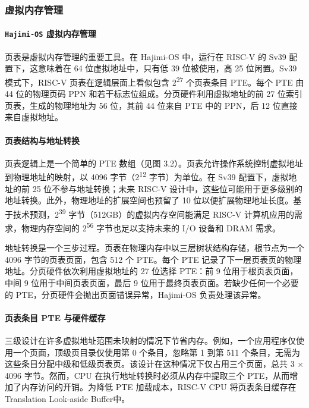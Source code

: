 \documentclass[UTF8]{article}
\begin{document}
\subsubsection{虚拟内存管理}

\paragraph{\texttt{Hajimi-OS} 虚拟内存管理\\}
页表是虚拟内存管理的重要工具。在 Hajimi-OS 中，运行在 RISC-V 的 Sv39 配置下，这意味着在 64 位虚拟地址中，只有低 39 位被使用，高 25 位闲置。Sv39 模式下，RISC-V 页表在逻辑层面上看似包含 2\textsuperscript{27} 个页表条目 PTE。每个 PTE 由 44 位的物理页码 PPN 和若干标志位组成。分页硬件利用虚拟地址的前 27 位索引页表，生成的物理地址为 56 位，其前 44 位来自 PTE 中的 PPN，后 12 位直接来自虚拟地址。

\paragraph{页表结构与地址转换\\}
页表逻辑上是一个简单的 PTE 数组（见图 3.2）。页表允许操作系统控制虚拟地址到物理地址的映射，以 4096 字节（2\textsuperscript{12} 字节）为单位。在 Sv39 配置下，虚拟地址的前 25 位不参与地址转换；未来 RISC-V 设计中，这些位可能用于更多级别的地址转换。此外，物理地址的扩展空间也预留了 10 位以便扩展物理地址长度。基于技术预测，2\textsuperscript{39} 字节（512GB）的虚拟内存空间能满足 RISC-V 计算机应用的需求，物理内存空间的 2\textsuperscript{56} 字节也足以支持未来的 I/O 设备和 DRAM 需求。

地址转换是一个三步过程。页表在物理内存中以三层树状结构存储，根节点为一个 4096 字节的页表页面，包含 512 个 PTE。每个 PTE 记录了下一层页表页的物理地址。分页硬件依次利用虚拟地址的 27 位选择 PTE：前 9 位用于根页表页面，中间 9 位用于中间页表页面，最后 9 位用于最终页表页面。若缺少任何一个必要的 PTE，分页硬件会抛出页面错误异常，Hajimi-OS 负责处理该异常。

\paragraph{页表条目 PTE 与硬件缓存\\}
三级设计在许多虚拟地址范围未映射的情况下节省内存。例如，一个应用程序仅使用一个页面，顶级页目录仅使用第 0 个条目，忽略第 1 到第 511 个条目，无需为这些条目分配中级和低级页表页。该设计在这种情况下仅占用三个页面，总共 3 × 4096 字节。然而，CPU 在执行地址转换时必须从内存中提取三个 PTE，从而增加了内存访问的开销。为降低 PTE 加载成本，RISC-V CPU 将页表条目缓存在 Translation Look-aside Buffer中。
\end{document}
